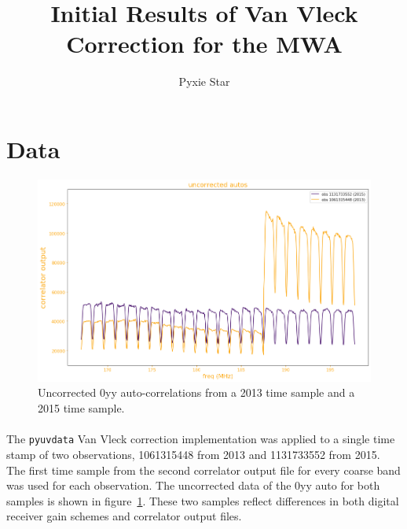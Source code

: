\documentclass[11pt]{article}
\title{Initial Results of Van Vleck Correction for the MWA}
\author{Pyxie Star}
\begin{document}
\maketitle

\section{Data}

\begin{figure}
\centering{}
\includegraphics[width=140mm]{uncorr_autos.png}
\caption{Uncorrected 0yy auto-correlations from a 2013 time sample and a 2015 time sample.\label{uncorr_autos}}
\end{figure}
\paragraph{}
The \texttt{pyuvdata} Van Vleck correction implementation was applied to a single time stamp of two observations, 1061315448 from 2013 and 1131733552 from 2015. The first time sample from the second correlator output file for every coarse band was used for each observation. The uncorrected data of the 0yy auto for both samples is shown in figure~\ref{uncorr_autos}. These two samples reflect differences in both digital receiver gain schemes and correlator output files.
\end{document}
